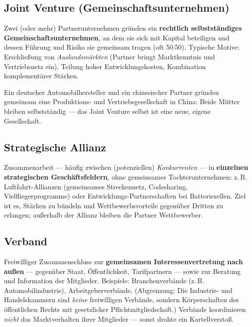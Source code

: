 \documentclass[11pt, a4paper]{article}
\begin{document}
\subsection{Joint Venture (Gemeinschaftsunternehmen)}

Zwei (oder mehr) Partnerunternehmen gründen ein \textbf{rechtlich selbstständiges
Gemeinschaftsunternehmen}, an dem sie sich mit Kapital beteiligen und dessen Führung und
Risiko sie gemeinsam tragen (oft 50:50). Typische Motive: Erschließung von
\emph{Auslandsmärkten} (Partner bringt Marktkenntnis und Vertriebsnetz ein), Teilung hoher
Entwicklungskosten, Kombination komplementärer Stärken.

\begin{beispiel}
Ein deutscher Automobilhersteller und ein chinesischer Partner gründen gemeinsam eine
Produktions- und Vertriebsgesellschaft in China: Beide Mütter bleiben selbstständig ---
das Joint Venture selbst ist eine neue, eigene Gesellschaft.
\end{beispiel}

\subsection{Strategische Allianz}

Zusammenarbeit --- häufig zwischen (potenziellen) \emph{Konkurrenten} --- in
\textbf{einzelnen strategischen Geschäftsfeldern}, ohne gemeinsames
Tochterunternehmen: z.\,B. Luftfahrt-Allianzen (gemeinsames Streckennetz, Codesharing,
Vielfliegerprogramme) oder Entwicklungs-Partnerschaften bei Batteriezellen. Ziel ist es,
Stärken zu bündeln und Wettbewerbsvorteile gegenüber Dritten zu erlangen; außerhalb der
Allianz bleiben die Partner Wettbewerber.

\subsection{Verband}

Freiwilliger Zusammenschluss zur \textbf{gemeinsamen Interessenvertretung nach außen} ---
gegenüber Staat, Öffentlichkeit, Tarifpartnern --- sowie zur Beratung und Information der
Mitglieder. Beispiele: Branchenverbände (z.\,B. Automobilindustrie), Arbeitgeberverbände.
(Abgrenzung: Die Industrie- und Handelskammern sind \emph{keine} freiwilligen Verbände,
sondern Körperschaften des öffentlichen Rechts mit gesetzlicher Pflichtmitgliedschaft.)
Verbände koordinieren \emph{nicht} das
Marktverhalten ihrer Mitglieder --- sonst drohte ein Kartellverstoß.
\end{document}
